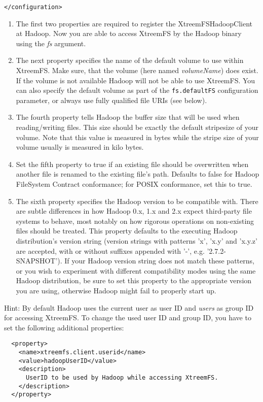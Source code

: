 \documentclass[a4paper,10pt]{book}
\begin{document}
\begin{enumerate}
\begin{enumerate}
\begin{verbatim}
</configuration>
	\end{verbatim}
	\begin{enumerate}
	\item The first two properties are required to register the XtreemFSHadoopClient at Hadoop. Now you are able to access
	XtreemFS by the Hadoop binary using the \textit{fs} argument.
	\item The next property specifies the name of the default volume to use within XtreemFS. Make sure, that the volume (here named \mbox{\textit{volumeName}}) does exist. If the volume is not available Hadoop will not be able to use XtreemFS. You can also specify the default volume as part of the \texttt{fs.defaultFS} configuration parameter, or always use fully qualified file URIs (see below).
	\item The fourth property tells Hadoop the buffer size that will be used when reading/writing files.
	This size should be exactly the default stripesize of your volume. Note that this value is measured in bytes while the
	stripe size of your volume usually is measured in kilo bytes.
	\item Set the fifth property to true if an existing file should be overwritten when another file is renamed to the existing file's path. Defaults to false for Hadoop FileSystem Contract conformance; for POSIX conformance, set this to true.
	\item The sixth property specifies the Hadoop version to be compatible with. There are subtle differences in how Hadoop 0.x, 1.x and 2.x expect third-party file systems to behave, most notably on how rigorous operations on non-existing files should be treated. This property defaults to the executing Hadoop distribution's version string (version strings with patterns 'x', 'x.y' and 'x.y.z' are accepted, with or without suffixes appended with '-', e.g. '2.7.2-SNAPSHOT'). If your Hadoop version string does not match these patterns, or you wish to experiment with different compatibility modes using the same Hadoop distribution, be sure to set this property to the appropriate version you are using, otherwise Hadoop might fail to properly start up.
	\end{enumerate}

  Hint: By default Hadoop uses the current user as user ID and \textit{users} as group ID for accessing XtreemFS. To change the used user ID and group ID, you have to set the following additional properties:
	\begin{verbatim}
  <property>
    <name>xtreemfs.client.userid</name>
    <value>hadoopUserID</value>
    <description>
      UserID to be used by Hadoop while accessing XtreemFS.
    </description>
  </property>


\end{verbatim}
\end{enumerate}
\end{enumerate}
\end{document}
